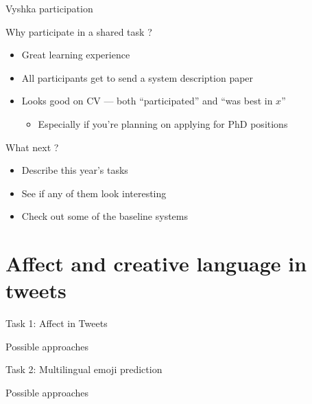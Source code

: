 \documentclass[10pt, compress]{beamer}
\begin{document}
\begin{frame}{Vyshka participation}

Why participate in a shared task ? 

\begin{itemize}
  \item Great learning experience
  \item All participants get to send a system description paper
  \item Looks good on CV --- both ``participated'' and ``was best in $x$''
  \begin{itemize}
    \item Especially if you're planning on applying for PhD positions
  \end{itemize}
\end{itemize}

What next ? 
\begin{itemize}
  \item Describe this year's tasks 
  \item See if any of them look interesting
  \item Check out some of the baseline systems 
\end{itemize}

\end{frame}

\section{Affect and creative language in tweets}

\begin{frame}{Task 1: Affect in Tweets}


\end{frame}

\begin{frame}{Possible approaches}


\end{frame}

\begin{frame}{Task 2: Multilingual emoji prediction}


\end{frame}

\begin{frame}{Possible approaches}


\end{frame}
\end{document}
